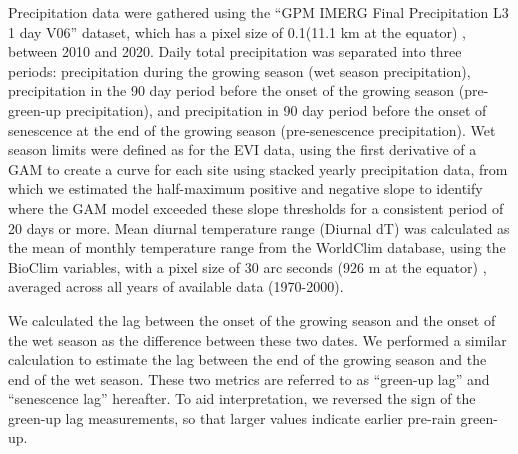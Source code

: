 \begin{refsection}
Precipitation data were gathered using the ``GPM IMERG Final Precipitation L3 1 day V06'' dataset, which has a pixel size of 0.1\textdegree (11.1 km at the equator) \citep{IMERG}, between 2010 and 2020. Daily total precipitation was separated into three periods: precipitation during the growing season (wet season precipitation), precipitation in the 90 day period before the onset of the growing season (pre-green-up precipitation), and precipitation in 90 day period before the onset of senescence at the end of the growing season (pre-senescence precipitation). Wet season limits were defined as for the EVI data, using the first derivative of a GAM to create a curve for each site using stacked yearly precipitation data, from which we estimated the half-maximum positive and negative slope to identify where the GAM model exceeded these slope thresholds for a consistent period of 20 days or more. Mean diurnal temperature range (Diurnal dT) was calculated as the mean of monthly temperature range from the WorldClim database, using the BioClim variables, with a pixel size of 30 arc seconds (926 m at the equator) \citep{Fick2017}, averaged across all years of available data (1970-2000). 

We calculated the lag between the onset of the growing season and the onset of the wet season as the difference between these two dates. We performed a similar calculation to estimate the lag between the end of the growing season and the end of the wet season. These two metrics are referred to as ``green-up lag'' and ``senescence lag'' hereafter. To aid interpretation, we reversed the sign of the green-up lag measurements, so that larger values indicate earlier pre-rain green-up.


\end{refsection}

